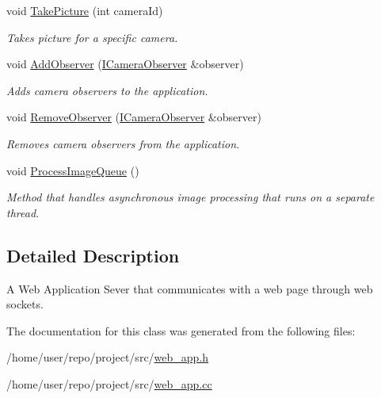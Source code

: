 \begin{DoxyCompactItemize}
void \hyperlink{classWebApp_a967d783a9f1be56fef662eee01b6e93a}{Take\+Picture} (int camera\+Id)
\begin{DoxyCompactList}\small\item\em Takes picture for a specific camera. \end{DoxyCompactList}\item 
\mbox{\label{classWebApp_a6ab15a70631109dc33d48e97da3eb050}} 
void \hyperlink{classWebApp_a6ab15a70631109dc33d48e97da3eb050}{Add\+Observer} (\hyperlink{classICameraObserver}{I\+Camera\+Observer} \&observer)
\begin{DoxyCompactList}\small\item\em Adds camera observers to the application. \end{DoxyCompactList}\item 
\mbox{\label{classWebApp_aa6c0e00182011fa15f0bd8fcbaf415a1}} 
void \hyperlink{classWebApp_aa6c0e00182011fa15f0bd8fcbaf415a1}{Remove\+Observer} (\hyperlink{classICameraObserver}{I\+Camera\+Observer} \&observer)
\begin{DoxyCompactList}\small\item\em Removes camera observers from the application. \end{DoxyCompactList}\item 
\mbox{\label{classWebApp_a96282cfecb4a378e9d9ce6fff3b8e746}} 
void \hyperlink{classWebApp_a96282cfecb4a378e9d9ce6fff3b8e746}{Process\+Image\+Queue} ()
\begin{DoxyCompactList}\small\item\em Method that handles asynchronous image processing that runs on a separate thread. \end{DoxyCompactList}\end{DoxyCompactItemize}


\subsection{Detailed Description}
A Web Application Sever that communicates with a web page through web sockets. 

The documentation for this class was generated from the following files\+:\begin{DoxyCompactItemize}
\item 
/home/user/repo/project/src/\hyperlink{web__app_8h}{web\+\_\+app.\+h}\item 
/home/user/repo/project/src/\hyperlink{web__app_8cc}{web\+\_\+app.\+cc}\end{DoxyCompactItemize}
